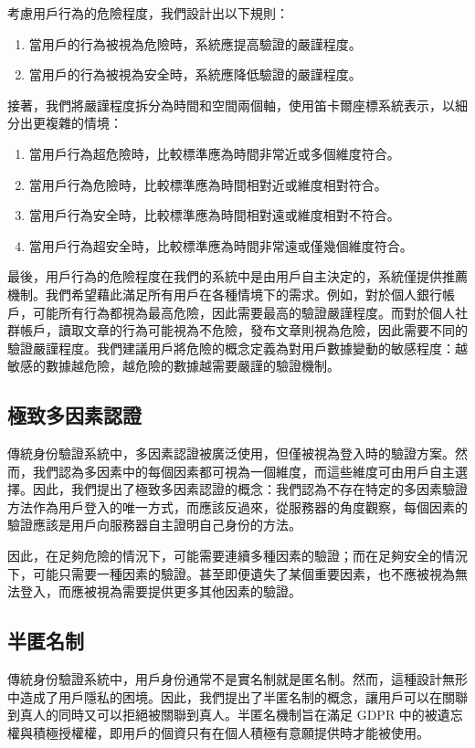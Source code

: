考慮用戶行為的危險程度，我們設計出以下規則：
\begin{enumerate}
  \item 當用戶的行為被視為危險時，系統應提高驗證的嚴謹程度。
  \item 當用戶的行為被視為安全時，系統應降低驗證的嚴謹程度。
\end{enumerate}

接著，我們將嚴謹程度拆分為時間和空間兩個軸，使用笛卡爾座標系統表示，以細分出更複雜的情境：
\begin{enumerate}
  \item 當用戶行為超危險時，比較標準應為時間非常近或多個維度符合。
  \item 當用戶行為危險時，比較標準應為時間相對近或維度相對符合。
  \item 當用戶行為安全時，比較標準應為時間相對遠或維度相對不符合。
  \item 當用戶行為超安全時，比較標準應為時間非常遠或僅幾個維度符合。
\end{enumerate}

最後，用戶行為的危險程度在我們的系統中是由用戶自主決定的，系統僅提供推薦機制。我們希望藉此滿足所有用戶在各種情境下的需求。例如，對於個人銀行帳戶，可能所有行為都視為最高危險，因此需要最高的驗證嚴謹程度。而對於個人社群帳戶，讀取文章的行為可能視為不危險，發布文章則視為危險，因此需要不同的驗證嚴謹程度。我們建議用戶將危險的概念定義為對用戶數據變動的敏感程度：越敏感的數據越危險，越危險的數據越需要嚴謹的驗證機制。
\subsection{極致多因素認證}
傳統身份驗證系統中，多因素認證被廣泛使用，但僅被視為登入時的驗證方案。然而，我們認為多因素中的每個因素都可視為一個維度，而這些維度可由用戶自主選擇。因此，我們提出了極致多因素認證的概念：我們認為不存在特定的多因素驗證方法作為用戶登入的唯一方式，而應該反過來，從服務器的角度觀察，每個因素的驗證應該是用戶向服務器自主證明自己身份的方法。

因此，在足夠危險的情況下，可能需要連續多種因素的驗證；而在足夠安全的情況下，可能只需要一種因素的驗證。甚至即便遺失了某個重要因素，也不應被視為無法登入，而應被視為需要提供更多其他因素的驗證。
\subsection{半匿名制}
傳統身份驗證系統中，用戶身份通常不是實名制就是匿名制。然而，這種設計無形中造成了用戶隱私的困境。因此，我們提出了半匿名制的概念，讓用戶可以在關聯到真人的同時又可以拒絕被關聯到真人。半匿名機制旨在滿足 GDPR 中的被遺忘權與積極授權權，即用戶的個資只有在個人積極有意願提供時才能被使用。

